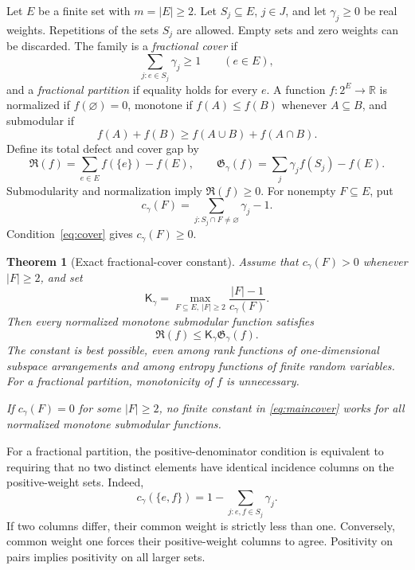 \documentclass[11pt]{article}
\newtheorem{theorem}{Theorem}[section]
\theoremstyle{definition}
\theoremstyle{remark}
\newcommand{\RR}{\mathbb R}
\newcommand{\1}{\mathbf 1}
\newcommand{\Red}{\mathfrak R}
\newcommand{\Gap}{\mathfrak G}
\newcommand{\Kopt}{\mathsf K}
\begin{document}
Let $E$ be a finite set with $m=|E|\ge2$. Let $S_j\subseteq E$,
$j\in J$, and let $\gamma_j\ge0$ be real weights. Repetitions of the sets
$S_j$ are allowed. Empty sets and zero weights can be discarded.
The family is a \emph{fractional cover} if
\begin{equation}
 \sum_{j:e\in S_j}\gamma_j\ge1\qquad(e\in E),
 \label{eq:cover}
\end{equation}
and a \emph{fractional partition} if equality holds for every $e$.
A function $f:2^E\to\RR$ is normalized if $f(\varnothing)=0$, monotone if
$f(A)\le f(B)$ whenever $A\subseteq B$, and submodular if
\[
 f(A)+f(B)\ge f(A\cup B)+f(A\cap B).
\]
Define its total defect and cover gap by
\begin{equation}
 \Red(f)=\sum_{e\in E}f(\{e\})-f(E),\qquad
 \Gap_\gamma(f)=\sum_j\gamma_j f(S_j)-f(E).
 \label{eq:defects}
\end{equation}
Submodularity and normalization imply $\Red(f)\ge0$.
For nonempty $F\subseteq E$, put
\begin{equation}
 c_\gamma(F)=\sum_{j:S_j\cap F\ne\varnothing}\gamma_j-1.
 \label{eq:coverageexcess}
\end{equation}
Condition~\eqref{eq:cover} gives $c_\gamma(F)\ge0$.

\begin{theorem}[Exact fractional-cover constant]
\label{thm:cover}
Assume that $c_\gamma(F)>0$ whenever $|F|\ge2$, and set
\begin{equation}
 \boxed{\displaystyle
 \Kopt_\gamma=\max_{F\subseteq E,\ |F|\ge2}
 \frac{|F|-1}{c_\gamma(F)}.}
 \label{eq:K}
\end{equation}
Then every normalized monotone submodular function satisfies
\begin{equation}
 \boxed{\displaystyle
 \Red(f)\le \Kopt_\gamma\Gap_\gamma(f).}
 \label{eq:maincover}
\end{equation}
The constant is best possible, even among rank functions of one-dimensional
subspace arrangements and among entropy functions of finite random variables.
For a fractional partition, monotonicity of $f$ is unnecessary.

If $c_\gamma(F)=0$ for some $|F|\ge2$, no finite constant in
\eqref{eq:maincover} works for all normalized monotone submodular functions.
\end{theorem}

For a fractional partition, the positive-denominator condition is equivalent
to requiring that no two distinct elements have identical incidence columns
on the positive-weight sets. Indeed,
\[
 c_\gamma(\{e,f\})=1-\sum_{j:e,f\in S_j}\gamma_j.
\]
If two columns differ, their common weight is strictly less than one. Conversely,
common weight one forces their positive-weight columns to agree. Positivity on
pairs implies positivity on all larger sets.
\end{document}
